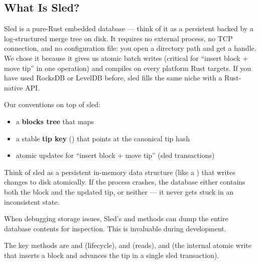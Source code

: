 \subsection{What Is Sled?}
\label{sec:ch11-what-is-sled}

Sled is a pure-Rust embedded database --- think of it as a persistent  backed by a log-structured merge tree on disk. It requires no external process, no TCP connection, and no configuration file: you open a directory path and get a  handle. We chose it because it gives us atomic batch writes (critical for ``insert block + move tip'' in one operation) and compiles on every platform Rust targets. If you have used RocksDB or LevelDB before, sled fills the same niche with a Rust-native API.

Our conventions on top of sled:

\begin{itemize}
  \item a \textbf{blocks tree} that maps 
  \item a stable \textbf{tip key} () that points at the canonical tip hash
  \item atomic updates for ``insert block + move tip'' (sled transactions)
\end{itemize}

Think of sled as a persistent in-memory data structure (like a ) that writes changes to disk atomically. If the process crashes, the database either contains both the block and the updated tip, or neither --- it never gets stuck in an inconsistent state.

\begin{notebox}
When debugging storage issues, Sled's  and  methods can dump the entire database contents for inspection. This is invaluable during development.
\end{notebox}

The key methods are  and  (lifecycle),  and  (reads), and  (the internal atomic write that inserts a block and advances the tip in a single sled transaction).

